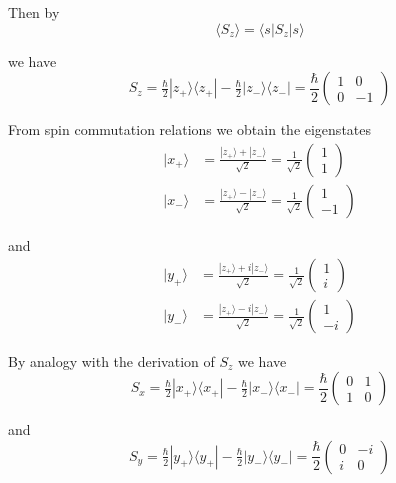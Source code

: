 Then by
\begin{equation*}
\langle S_z\rangle=\langle s|S_z|s\rangle
\end{equation*}

we have
\begin{equation*}
S_z=\tfrac{\hbar}{2}|z_+\rangle\langle z_+|-\tfrac{\hbar}{2}|z_-\rangle\langle z_-|
=\frac{\hbar}{2}\begin{pmatrix}1&0\\0&-1\end{pmatrix}
\end{equation*}

From spin commutation relations we obtain the eigenstates
\begin{align*}
|x_+\rangle&=\frac{|z_+\rangle+|z_-\rangle}{\sqrt2}=\frac{1}{\sqrt2}\begin{pmatrix}1\\1\end{pmatrix}
\\
|x_-\rangle&=\frac{|z_+\rangle-|z_-\rangle}{\sqrt2}=\frac{1}{\sqrt2}\begin{pmatrix}1\\-1\end{pmatrix}
\end{align*}

and
\begin{align*}
|y_+\rangle&=\frac{|z_+\rangle+i|z_-\rangle}{\sqrt2}=\frac{1}{\sqrt2}\begin{pmatrix}1\\i\end{pmatrix}
\\
|y_-\rangle&=\frac{|z_+\rangle-i|z_-\rangle}{\sqrt2}=\frac{1}{\sqrt2}\begin{pmatrix}1\\-i\end{pmatrix}
\end{align*}

By analogy with the derivation of $S_z$ we have
\begin{equation*}
S_x=\tfrac{\hbar}{2}|x_+\rangle\langle x_+|-\tfrac{\hbar}{2}|x_-\rangle\langle x_-|
=\frac{\hbar}{2}\begin{pmatrix}0&1\\1&0\end{pmatrix}
\end{equation*}

and
\begin{equation*}
S_y=\tfrac{\hbar}{2}|y_+\rangle\langle y_+|-\tfrac{\hbar}{2}|y_-\rangle\langle y_-|
=\frac{\hbar}{2}\begin{pmatrix}0&-i\\i&0\end{pmatrix}
\end{equation*}

